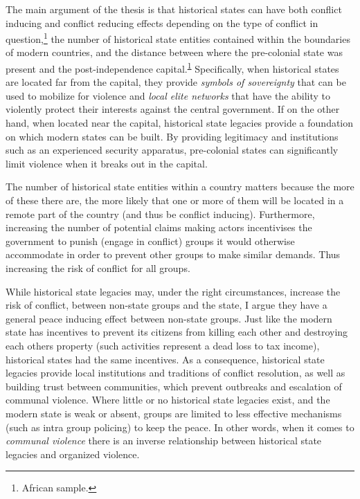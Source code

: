 The main argument of the thesis is that historical states can have both conflict
inducing and conflict reducing effects depending on the type of conflict in
question,\footnote{\label{note1}African sample.} the number of historical state
entities contained within the boundaries of modern countries, and the distance
between where the pre-colonial state was present and the post-independence
capital.\textsuperscript{\ref{note1}} Specifically, when historical states are
located far from the capital, they provide \textit{symbols of sovereignty} that
can be used to mobilize for violence and \textit{local elite networks} that have
the ability to violently protect their interests against the central government.
If on the other hand, when located near the capital, historical state legacies
provide a foundation on which modern states can be built. By providing
legitimacy and institutions such as an experienced security apparatus,
pre-colonial states can significantly limit violence when it breaks out in the
capital.

The number of historical state entities within a country matters because the
more of these there are, the more likely that one or more of them will be
located in a remote part of the country (and thus be conflict inducing).
Furthermore, increasing the number of potential claims making actors
incentivises the government to punish (engage in conflict) groups it would
otherwise accommodate in order to prevent other groups to make similar
demands. Thus increasing the risk of conflict for all groups.

While historical state legacies may, under the right circumstances, increase the
risk of conflict, between non-state groups and the state, I argue they have a
general peace inducing effect between non-state groups. Just like the modern
state has incentives to prevent its citizens from killing each other and
destroying each others property (such activities represent a dead loss to tax
income), historical states had the same incentives. As a consequence, historical
state legacies provide local institutions and traditions of conflict resolution,
as well as building trust between communities, which prevent outbreaks and
escalation of communal violence. Where little or no historical state legacies
exist, and the modern state is weak or absent, groups are limited to less
effective mechanisms (such as intra group policing) to keep the peace. In other
words, when it comes to \textit{communal violence} there is an inverse
relationship between historical state legacies and organized violence.

